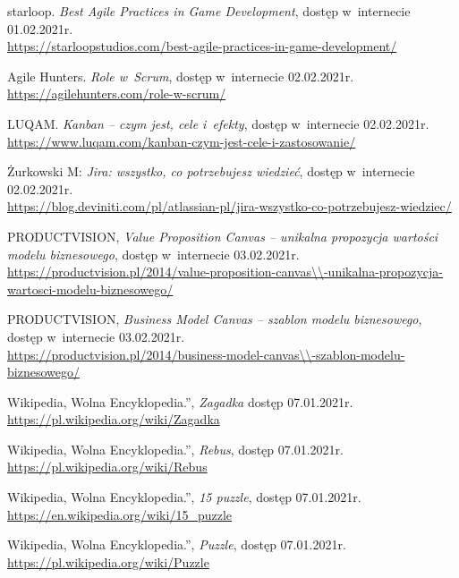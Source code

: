 \documentclass[oneside,polski,logo]{amuthesis}
\begin{document}
\begin{thebibliography}{100}
starloop. \emph{Best Agile Practices in Game Development}, dostęp w~internecie 01.02.2021r.\\
\url{https://starloopstudios.com/best-agile-practices-in-game-development/}

Agile Hunters. \emph{Role w~Scrum}, dostęp w~internecie 02.02.2021r.\\
\url{https://agilehunters.com/role-w-scrum/}

LUQAM. \emph{Kanban – czym jest, cele i~efekty}, dostęp w~internecie 02.02.2021r.\\
\url{https://www.luqam.com/kanban-czym-jest-cele-i-zastosowanie/}

Żurkowski M: \emph{Jira: wszystko, co potrzebujesz wiedzieć}, dostęp w~internecie 02.02.2021r.\\
\url{https://blog.deviniti.com/pl/atlassian-pl/jira-wszystko-co-potrzebujesz-wiedziec/}

PRODUCTVISION, \emph{Value Proposition Canvas – unikalna propozycja wartości modelu biznesowego}, dostęp w~internecie 03.02.2021r.\\
\url{https://productvision.pl/2014/value-proposition-canvas\\-unikalna-propozycja-wartosci-modelu-biznesowego/}

PRODUCTVISION, \emph{Business Model Canvas – szablon modelu biznesowego}, dostęp w~internecie 03.02.2021r.\\
\url{https://productvision.pl/2014/business-model-canvas\\-szablon-modelu-biznesowego/}

Wikipedia, Wolna Encyklopedia.”, \emph{Zagadka} dostęp 07.01.2021r.
\\ \url{https://pl.wikipedia.org/wiki/Zagadka}

Wikipedia, Wolna Encyklopedia.”, \emph{Rebus}, dostęp 07.01.2021r.
\\ \url{https://pl.wikipedia.org/wiki/Rebus}

Wikipedia, Wolna Encyklopedia.”, \emph{15 puzzle}, dostęp 07.01.2021r.
\\ \url{https://en.wikipedia.org/wiki/15\_puzzle}

Wikipedia, Wolna Encyklopedia.”, \emph{Puzzle}, dostęp 07.01.2021r.
\\ \url{https://pl.wikipedia.org/wiki/Puzzle}


\end{thebibliography}
\end{document}
